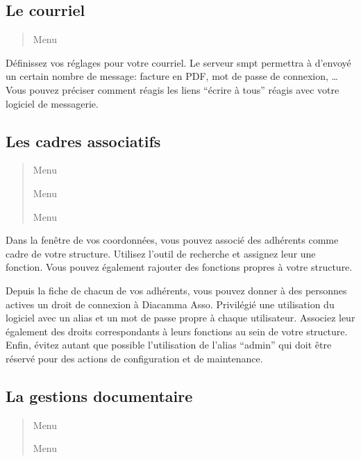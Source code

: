 \documentclass[a4paper,10pt,oneside,french]{sphinxmanual}
\begin{document}
\subsection{Le courriel}
\label{\detokenize{asso/first_step:le-courriel}}\begin{quote}

Menu 
\end{quote}

Définissez vos réglages pour votre courriel.
Le serveur smpt permettra à  d’envoyé un certain nombre de message: facture en PDF, mot de passe de connexion, …
Vous pouvez préciser comment réagis les liens “écrire à tous” réagis avec votre logiciel de messagerie.


\subsection{Les cadres associatifs}
\label{\detokenize{asso/first_step:les-cadres-associatifs}}\begin{quote}

Menu 

Menu 

Menu 
\end{quote}

Dans la fenêtre de vos coordonnées, vous pouvez associé des adhérents comme cadre de votre structure.
Utilisez l’outil de recherche et assignez leur une fonction.
Vous pouvez également rajouter des fonctions propres à votre structure.

Depuis la fiche de chacun de vos adhérents, vous pouvez donner à des personnes actives un droit de connexion à Diacamma Asso.
Privilégié une utilisation du logiciel avec un alias et un mot de passe propre à chaque utilisateur. Associez leur également des droits correspondants à leurs fonctions au sein de votre structure.
Enfin, évitez autant que possible l’utilisation de l’alias “admin” qui doit être réservé pour des actions de configuration et de maintenance.


\subsection{La gestions documentaire}
\label{\detokenize{asso/first_step:la-gestions-documentaire}}\begin{quote}

Menu 

Menu 
\end{quote}
\end{document}
